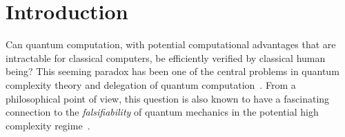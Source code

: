 \section{Introduction}
Can quantum computation, with potential computational advantages that are intractable for classical computers,
be efficiently verified by classical human being? 
This seeming paradox has been one of the central problems in quantum complexity theory and delegation of quantum computation~\cite{web:Aaronson}. 
From a philosophical point of view, this question is also known to have a fascinating connection to the \emph{falsifiability} of quantum mechanics in the potential high complexity regime~\cite{survey:AV12}. 

